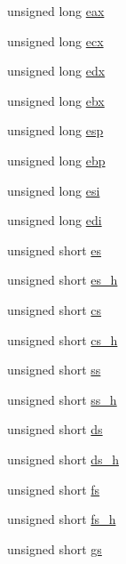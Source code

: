 \begin{DoxyCompactItemize}
\item 
unsigned long \hyperlink{struct____tss__struct_aa70f529f7adea9e30313ef9fcd0191da}{eax}
\item 
unsigned long \hyperlink{struct____tss__struct_ab0e3aa7395c5639c49855a2dd5cc2be0}{ecx}
\item 
unsigned long \hyperlink{struct____tss__struct_affcb93ba4eb271762b3167a13be06a83}{edx}
\item 
unsigned long \hyperlink{struct____tss__struct_ac67f49c13b208df1720f9ca9c0da17dc}{ebx}
\item 
unsigned long \hyperlink{struct____tss__struct_aa35a140c36667e429be9f52526e5c019}{esp}
\item 
unsigned long \hyperlink{struct____tss__struct_abe00097e1842c728d70854ca727da16c}{ebp}
\item 
unsigned long \hyperlink{struct____tss__struct_aa726c858975c07c9f225dfb1143fa638}{esi}
\item 
unsigned long \hyperlink{struct____tss__struct_a3f7cde8faad6aa59cd3b36bf8493a315}{edi}
\item 
unsigned short \hyperlink{struct____tss__struct_a068c08e101d0fd8e66cb315446f64532}{es}
\item 
unsigned short \hyperlink{struct____tss__struct_a2578c9748d5a0bd005dead21a80bd5e5}{es\+\_\+h}
\item 
unsigned short \hyperlink{struct____tss__struct_adbf2980b4b9a4b505dbb3886ad657357}{cs}
\item 
unsigned short \hyperlink{struct____tss__struct_a20fd7d98f390bda555de791fff0d6fda}{cs\+\_\+h}
\item 
unsigned short \hyperlink{struct____tss__struct_abc595ca5102923b8b55bb4ce98bbe8db}{ss}
\item 
unsigned short \hyperlink{struct____tss__struct_a1c717fd639092811a9d4b548d6115b36}{ss\+\_\+h}
\item 
unsigned short \hyperlink{struct____tss__struct_a7d135efa48729e8d72c58f68395d0a23}{ds}
\item 
unsigned short \hyperlink{struct____tss__struct_a21e478f52a03d836cc45af1a49f4d876}{ds\+\_\+h}
\item 
unsigned short \hyperlink{struct____tss__struct_a4f47bf398ce57037b89c3b9f42e0ce18}{fs}
\item 
unsigned short \hyperlink{struct____tss__struct_a065694d5def8420fa4411053c460cb04}{fs\+\_\+h}
\item 
unsigned short \hyperlink{struct____tss__struct_ad99e75893aedb89cd0e136e3e6e57727}{gs}
\item 

\end{DoxyCompactItemize}
